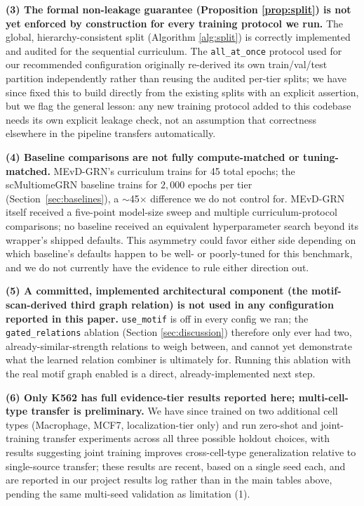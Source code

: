\documentclass{article}
\theoremstyle{plain}
\theoremstyle{definition}
\begin{document}
\textbf{(3) The formal non-leakage guarantee (Proposition \ref{prop:split})
is not yet enforced by construction for every training protocol we run.}
The global, hierarchy-consistent split (Algorithm \ref{alg:split}) is
correctly implemented and audited for the sequential curriculum. The
\texttt{all\_at\_once} protocol used for our recommended configuration
originally re-derived its own train/val/test partition independently
rather than reusing the audited per-tier splits; we have since fixed this
to build directly from the existing splits with an explicit assertion, but
we flag the general lesson: any new training protocol added to this
codebase needs its own explicit leakage check, not an assumption that
correctness elsewhere in the pipeline transfers automatically.

\textbf{(4) Baseline comparisons are not fully compute-matched or
tuning-matched.} MEvD-GRN's curriculum trains for 45 total epochs; the
scMultiomeGRN baseline trains for $2{,}000$ epochs per tier
(Section~\ref{sec:baselines}), a $\sim$45$\times$ difference we do not
control for. MEvD-GRN itself received a five-point model-size sweep and
multiple curriculum-protocol comparisons; no baseline received an
equivalent hyperparameter search beyond its wrapper's shipped defaults.
This asymmetry could favor either side depending on which baseline's
defaults happen to be well- or poorly-tuned for this benchmark, and we do
not currently have the evidence to rule either direction out.

\textbf{(5) A committed, implemented architectural component (the
motif-scan-derived third graph relation) is not used in any configuration
reported in this paper.} \texttt{use\_motif} is off in every config we ran;
the \texttt{gated\_relations} ablation (Section \ref{sec:discussion})
therefore only ever had two, already-similar-strength relations to weigh
between, and cannot yet demonstrate what the learned relation combiner is
ultimately for. Running this ablation with the real motif graph enabled is
a direct, already-implemented next step.

\textbf{(6) Only K562 has full evidence-tier results reported here;
multi-cell-type transfer is preliminary.} We have since trained on two
additional cell types (Macrophage, MCF7, localization-tier only) and run
zero-shot and joint-training transfer experiments across all three possible
holdout choices, with results suggesting joint training improves
cross-cell-type generalization relative to single-source transfer; these
results are recent, based on a single seed each, and are reported in our
project results log rather than in the main tables above, pending the same
multi-seed validation as limitation (1).
\end{document}
